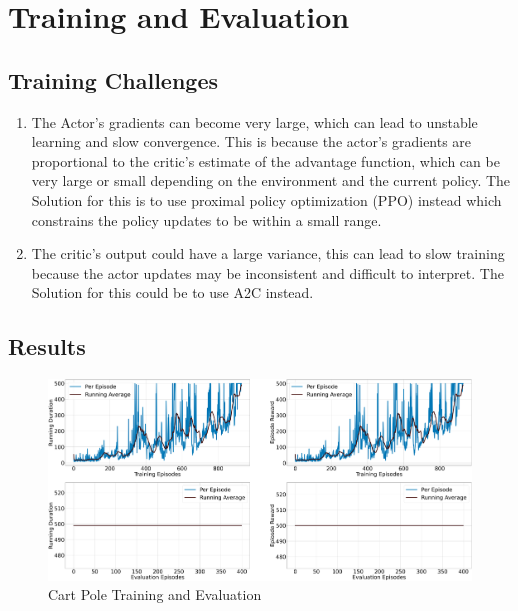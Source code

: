 \documentclass{article} %
\begin{document}
\section{Training and Evaluation}

\subsection{Training Challenges}

\begin{enumerate}
\item The Actor's gradients can become very large, which can lead to unstable learning and slow convergence. This is because the actor's gradients are proportional to the critic's estimate of the advantage function, which can be very large or small depending on the environment and the current policy. The Solution for this is to use proximal policy optimization (PPO) instead which constrains the policy updates to be within a small range.
\item The critic's output could have a large variance, this can lead to slow training because the actor updates may be inconsistent and difficult to interpret. The Solution for this could be to use A2C instead.
\end{enumerate}

\subsection{Results}
\begin{figure}[H]
    \begin{center}
        \includegraphics[width=\textwidth]{qac_cartpole.png}
    \end{center}
    \caption{Cart Pole Training and Evaluation}
\end{figure}
\end{document}
